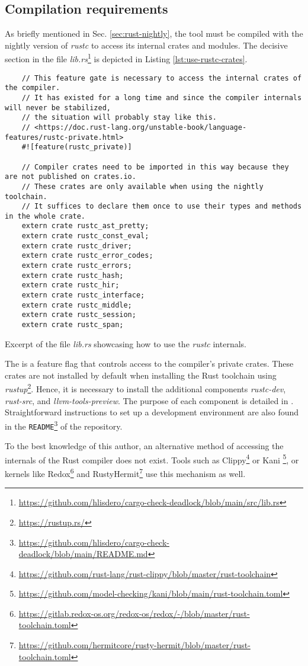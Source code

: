 \subsection{Compilation requirements}

As briefly mentioned in Sec. \ref{sec:rust-nightly}, the tool must be compiled
with the nightly version of \emph{rustc} to access its internal crates and modules.
The decisive section in the file
\emph{lib.rs}\footnote{\url{https://github.com/hlisdero/cargo-check-deadlock/blob/main/src/lib.rs}} is
depicted in Listing \ref{lst:use-rustc-crates}.

\begin{listing}[!htb]
  \begin{verbatim}
    // This feature gate is necessary to access the internal crates of the compiler.
    // It has existed for a long time and since the compiler internals will never be stabilized,
    // the situation will probably stay like this.
    // <https://doc.rust-lang.org/unstable-book/language-features/rustc-private.html>
    #![feature(rustc_private)]
    
    // Compiler crates need to be imported in this way because they are not published on crates.io.
    // These crates are only available when using the nightly toolchain.
    // It suffices to declare them once to use their types and methods in the whole crate.
    extern crate rustc_ast_pretty;
    extern crate rustc_const_eval;
    extern crate rustc_driver;
    extern crate rustc_error_codes;
    extern crate rustc_errors;
    extern crate rustc_hash;
    extern crate rustc_hir;
    extern crate rustc_interface;
    extern crate rustc_middle;
    extern crate rustc_session;
    extern crate rustc_span;
  \end{verbatim}
  \caption{Excerpt of the file \emph{lib.rs} showcasing how to use the \emph{rustc} internals.}
  \label{lst:use-rustc-crates}
\end{listing}

The  is a feature flag
that controls access to the compiler's private crates.
These crates are not installed by default when installing the Rust toolchain
using \emph{rustup}\footnote{\url{https://rustup.rs/}}.
Hence, it is necessary to install the additional components \emph{rustc-dev},
\emph{rust-src}, and \emph{llvm-tools-preview}.
The purpose of each component is detailed in \cite{rustup-book}.
Straightforward instructions to set up a development environment are also found
in the \texttt{README}\footnote{\url{https://github.com/hlisdero/cargo-check-deadlock/blob/main/README.md}}
of the repository.

To the best knowledge of this author,
an alternative method of accessing the internals of the Rust compiler does not exist.
Tools such as
Clippy\footnote{\url{https://github.com/rust-lang/rust-clippy/blob/master/rust-toolchain}} or
Kani \footnote{\url{https://github.com/model-checking/kani/blob/main/rust-toolchain.toml}}, or
kernels like Redox\footnote{\url{https://gitlab.redox-os.org/redox-os/redox/-/blob/master/rust-toolchain.toml}} and
RustyHermit\footnote{\url{https://github.com/hermitcore/rusty-hermit/blob/master/rust-toolchain.toml}}
use this mechanism as well.